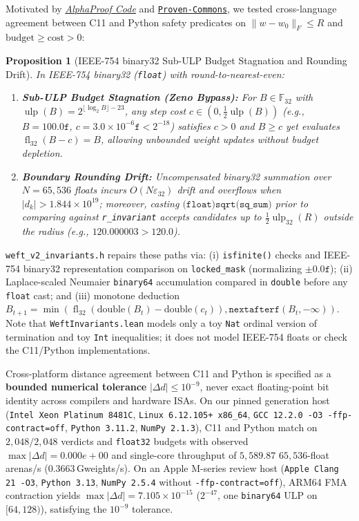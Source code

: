 \documentclass[10pt,a4paper]{article}
\newtheorem{proposition}[theorem]{Proposition}
\begin{document}
Motivated by \href{https://deepmind.google/blog/introducing-alphaproof-code/}{\emph{AlphaProof Code}} and \href{https://github.com/Proven-Commons/mission}{\texttt{Proven-Commons}}, we tested cross-language agreement between C11 and Python safety predicates on $\|w - w_0\|_F \le R$ and $\text{budget} \ge \text{cost} > 0$:

\begin{proposition}[IEEE-754 binary32 Sub-ULP Budget Stagnation and Rounding Drift]\label{thm:zeno}
In IEEE-754 binary32 (\texttt{float}) with round-to-nearest-even:
\begin{enumerate}
  \item \textbf{Sub-ULP Budget Stagnation (Zeno Bypass):} For $B \in \mathbb{F}_{32}$ with $\operatorname{ulp}(B) = 2^{\lfloor \log_2 B \rfloor - 23}$, any step cost $c \in (0, \frac{1}{2}\operatorname{ulp}(B))$ (e.g., $B = 100.0\texttt{f}$, $c = 3.0 \times 10^{-6}\texttt{f} < 2^{-18}$) satisfies $c > 0$ and $B \ge c$ yet evaluates $\operatorname{fl}_{32}(B - c) = B$, allowing unbounded weight updates without budget depletion.
  \item \textbf{Boundary Rounding Drift:} Uncompensated binary32 summation over $N = 65{,}536$ floats incurs $O(N \varepsilon_{32})$ drift and overflows when $|d_k| > 1.844 \times 10^{19}$; moreover, casting $\texttt{(float)sqrt(sq\_sum)}$ prior to comparing against \texttt{r\_invariant} accepts candidates up to $\frac{1}{2}\operatorname{ulp}_{32}(R)$ outside the radius (e.g., $120.000003 > 120.0$).
\end{enumerate}
\end{proposition}

\texttt{weft\_v2\_invariants.h} repairs these paths via: (i) \texttt{isfinite()} checks and IEEE-754 binary32 representation comparison on \texttt{locked\_mask} (normalizing $\pm 0.0\texttt{f}$); (ii) Laplace-scaled Neumaier \texttt{binary64} accumulation compared in \texttt{double} before any \texttt{float} cast; and (iii) monotone deduction $B_{t+1} = \min(\operatorname{fl}_{32}(\text{double}(B_t) - \text{double}(c_t)), \texttt{nextafterf}(B_t, -\infty))$. Note that \texttt{WeftInvariants.lean} models only a toy \texttt{Nat} ordinal version of termination and toy \texttt{Int} inequalities; it does not model IEEE-754 floats or check the C11/Python implementations.

Cross-platform distance agreement between C11 and Python is specified as a \textbf{bounded numerical tolerance} $|\Delta d| \le 10^{-9}$, never exact floating-point bit identity across compilers and hardware ISAs. On our pinned generation host (\texttt{Intel Xeon Platinum 8481C}, \texttt{Linux 6.12.105+ x86\_64}, \texttt{GCC 12.2.0 -O3 -ffp-contract=off}, \texttt{Python 3.11.2}, \texttt{NumPy 2.1.3}), C11 and Python match on $2{,}048/2{,}048$ verdicts and \texttt{float32} budgets with observed $\max |\Delta d| = 0.000e+00$ and single-core throughput of $5,589.87$ $65{,}536$-float arenas/s ($0.3663$\,Gweights/s). On an Apple M-series review host (\texttt{Apple Clang 21 -O3}, \texttt{Python 3.13}, \texttt{NumPy 2.5.4} without \texttt{-ffp-contract=off}), ARM64 FMA contraction yields $\max |\Delta d| = 7.105 \times 10^{-15}$ ($2^{-47}$, one \texttt{binary64} ULP on $[64, 128)$), satisfying the $10^{-9}$ tolerance.
\end{document}
